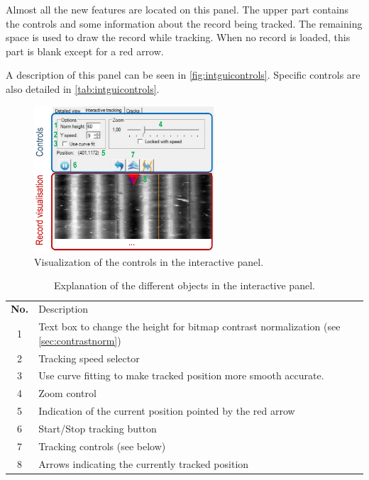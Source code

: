 Almost all the new features are located on this panel. The upper part contains the controls and some information about the record being tracked. The remaining space is used to draw the record while tracking. When no record is loaded, this part is blank except for a red arrow.

A description of this panel can be seen in \autoref{fig:intguicontrols}. Specific controls are also detailed in \autoref{tab:intguicontrols}.

\begin{figure}[!ht]
\centering
\includegraphics[width=0.6\textwidth]{images/int-track-controls}
\caption{Visualization of the controls in the interactive panel.}
\label{fig:intguicontrols}
\end{figure}

\begin{table}[h!]
\begin{center}
\tabulinesep=3pt
\begin{tabu} to 0.7\textwidth {| c | X[m] |} %
    \everyrow{\hline}
    \hline
    \rowfont[c] \bfseries
        No. & Description \\
        1 & Text box to change the height for bitmap contrast normalization (see \autoref{sec:contrastnorm}) \\
        2 & Tracking speed selector \\
        3 & Use curve fitting to make tracked position more smooth accurate. \\
        4 & Zoom control \\
        5 & Indication of the current position pointed by the red arrow \\
        6 & Start/Stop tracking button \\
        7 & Tracking controls (see below) \\
        8 & Arrows indicating the currently tracked position \\
\end{tabu}
\end{center}
\caption{Explanation of the different objects in the interactive panel.}
\label{tab:intguicontrols}
\end{table}

